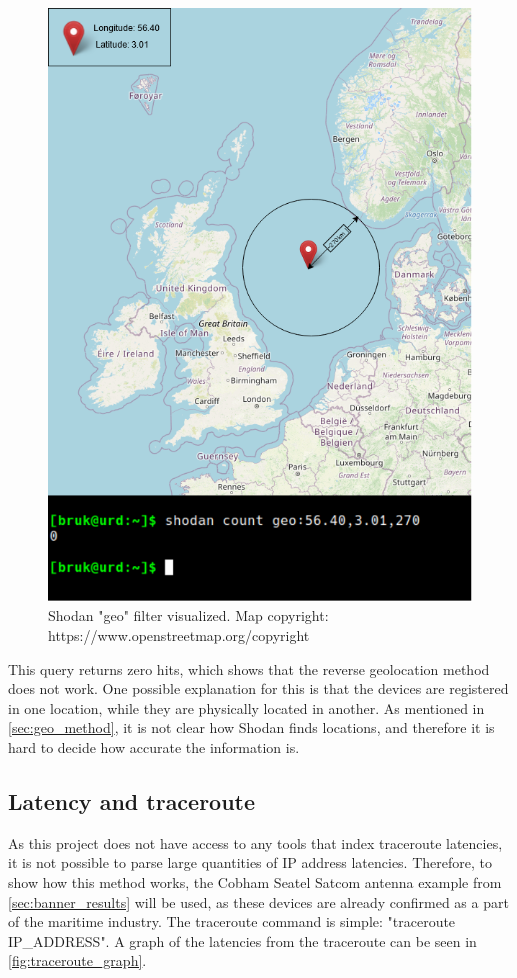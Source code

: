 \begin{figure} [H]
    \centering
    \includegraphics[scale=0.5]{Figurer/geolocation.png}
    \caption{Shodan "geo" filter visualized. Map copyright: https://www.openstreetmap.org/copyright}
    \label{fig:geolocation}
\end{figure}

This query returns zero hits, which shows that the reverse geolocation method does not work. One possible explanation for this is that the devices are registered in one location, while they are physically located in another. As mentioned in \cref{sec:geo_method}, it is not clear how Shodan finds locations, and therefore it is hard to decide how accurate the information is.

\subsection{Latency and traceroute} \label{sec:latency_results}
As this project does not have access to any tools that index traceroute latencies, it is not possible to parse large quantities of IP address latencies. Therefore, to show how this method works, the Cobham Seatel Satcom antenna example from \cref{sec:banner_results} will be used, as these devices are already confirmed as a part of the maritime industry. The traceroute command is simple: "traceroute IP\_ADDRESS". A graph of the latencies from the traceroute can be seen in \cref{fig:traceroute_graph}.

